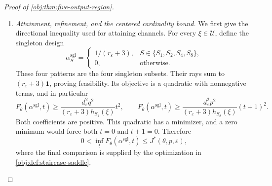 \begin{proof}[Proof of \cref{obj:thm:five-output-region}]
\begin{enumerate}
The row constraints already show that
\[
\beta_{S_3}=\beta_{S_4}=\beta_{S_8}
=\frac{1-4\beta_{S_6}}5,
\qquad
\beta_{S_9}=\beta_{S_6}.
\]
To solve the remaining stationarity equation, define its reduced
coefficient
\[
C_{\mathrm{cen}}
=
10s_{\mathrm{cen}}p^2+5s_{\mathrm{cen}}p
-5s_{\mathrm{cen}}-8p^2.
\]
Substitute these row coordinates into the displayed derivative formula,
use \(t_{\mathrm{cen}}=(p-s_{\mathrm{cen}})/D_{\mathrm{cen}}\), and clear
the positive denominators. The resulting equation is
\[
(p-1)\bigl(C_{\mathrm{cen}}\beta_{S_6}+2p^2\bigr)=0.
\]
Since \(p<1/2\), it follows that
\[
C_{\mathrm{cen}}\beta_{S_6}=-2p^2.
\]
The square identity for \(s_{\mathrm{cen}}\) further gives
\[
\begin{aligned}
C_{\mathrm{cen}}s_{\mathrm{cen}}
&=5(2p-1)(1+p)s_{\mathrm{cen}}^2-8p^2s_{\mathrm{cen}}\\
&=-8p^2D_{\mathrm{cen}}<0.
\end{aligned}
\]
Thus \(C_{\mathrm{cen}}\ne0\), and
\[
C_{\mathrm{cen}}\bigl(4D_{\mathrm{cen}}\beta_{S_6}\bigr)
=
-8p^2D_{\mathrm{cen}}
=
C_{\mathrm{cen}}s_{\mathrm{cen}}.
\]
Cancellation proves
\[
\beta_{S_6}=\frac{s_{\mathrm{cen}}}{4D_{\mathrm{cen}}}
=\alpha_{\mathrm{cen},S_6}.
\]
The row-coordinate identities determine the other four active weights,
and both vectors vanish elsewhere. Hence
\[
\beta=\alpha_{\mathrm{cen}},
\]
proving the centered uniqueness assertion.

\item \textit{Attainment, refinement, and the centered cardinality bound.}
We first give the directional inequality used for attaining channels.
For every \(\xi\in\mathcal U\), define the singleton design
\[
\alpha^{\mathrm{sgl}}_S=
\begin{cases}
1/(r_\varepsilon+3),&S\in\{S_1,S_2,S_4,S_8\},\\
0,&\text{otherwise}.
\end{cases}
\]
These four patterns are the four singleton subsets. Their rays sum to
\((r_\varepsilon+3)\mathbf1\), proving feasibility. Its objective is a
quadratic with nonnegative terms, and in particular
\[
F_\theta(\alpha^{\mathrm{sgl}},t)
\ge
\frac{d_\varepsilon^2q^2}
     {(r_\varepsilon+3)h_{S_1}(\xi)}t^2,
\qquad
F_\theta(\alpha^{\mathrm{sgl}},t)
\ge
\frac{d_\varepsilon^2p^2}
     {(r_\varepsilon+3)h_{S_8}(\xi)}(t+1)^2.
\]
Both coefficients are positive. This quadratic has a minimizer, and a
zero minimum would force both \(t=0\) and \(t+1=0\). Therefore
\[
0<\inf_tF_\theta(\alpha^{\mathrm{sgl}},t)
\le J^*(\theta,p,\varepsilon),
\]
where the final comparison is supplied by the optimization in
\cref{obj:def:staircase-saddle}.


\end{enumerate}
\end{proof}
